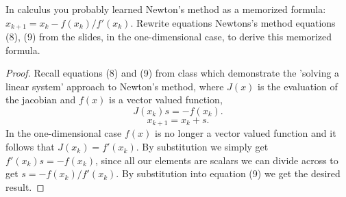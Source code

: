 \documentclass[12pt]{article}
\makeatletter
\theoremstyle{homework}
\newenvironment{exercise}[1]
{\def\@currentlabel{#1}\exercisecore}
{\endexercisecore}
\makeatother
\begin{document}
\begin{exercise}{Problem P16} In calculus you probably learned Newton's method as a memorized formula:
  $x_{k+1} = x_k - f(x_k)/f'(x_k)$. Rewrite equations Newtons's method equations (8), (9) from the slides, 
  in the one-dimensional case, to derive this memorized formula.
  \begin{proof} Recall equations (8) and (9) from class which demonstrate the 'solving a linear system' approach 
    to Newton's method, where $J(x)$ is the evaluation of the jacobian and $f(x)$ is a vector valued function, 
    \begin{equation*}
      J(x_k)s = -f(x_k).
    \end{equation*}
    \begin{equation*}
      x_{k+1} = x_k + s.
    \end{equation*}
    In the one-dimensional case $f(x)$ is no longer a vector valued function and it follows that $J(x_k) = f'(x_k)$. 
    By substitution we simply get $f'(x_k)s = -f(x_k)$, since all our elements are scalars we can divide across to get 
    $s = -f(x_k)/f'(x_k)$. By substitution into equation (9) we get the desired result. 
  \end{proof}
  
\end{exercise}
\vspace{1in}
\end{document}
